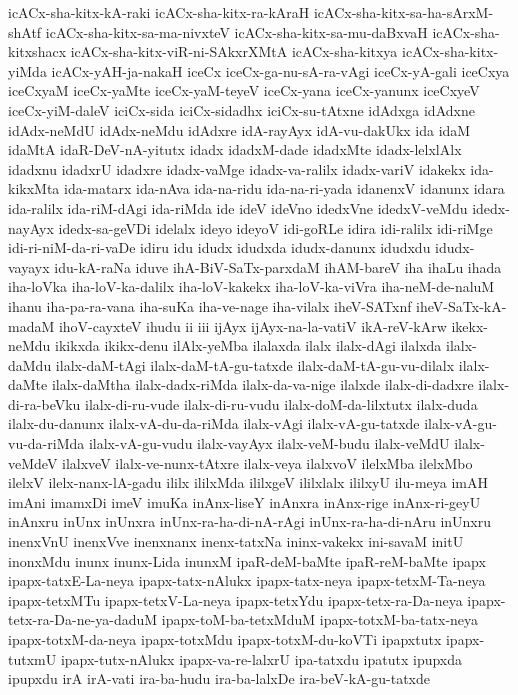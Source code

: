 {icACx-sha-kitx-kA-raki
icACx-sha-kitx-ra-kAraH
icACx-sha-kitx-sa-ha-sArxM-shAtf
icACx-sha-kitx-sa-ma-nivxteV
icACx-sha-kitx-sa-mu-daBxvaH
icACx-sha-kitxshacx
icACx-sha-kitx-viR-ni-SAkxrXMtA
icACx-sha-kitxya
icACx-sha-kitx-yiMda
icACx-yAH-ja-nakaH
iceCx
iceCx-ga-nu-sA-ra-vAgi
iceCx-yA-gali
iceCxya
iceCxyaM
iceCx-yaMte
iceCx-yaM-teyeV
iceCx-yana
iceCx-yanunx
iceCxyeV
iceCx-yiM-daleV
iciCx-sida
iciCx-sidadhx
iciCx-su-tAtxne
idAdxga
idAdxne
idAdx-neMdU
idAdx-neMdu
idAdxre
idA-rayAyx
idA-vu-dakUkx
ida
idaM
idaMtA
idaR-DeV-nA-yitutx
idadx
idadxM-dade
idadxMte
idadx-lelxlAlx
idadxnu
idadxrU
idadxre
idadx-vaMge
idadx-va-ralilx
idadx-variV
idakekx
ida-kikxMta
ida-matarx
ida-nAva
ida-na-ridu
ida-na-ri-yada
idanenxV
idanunx
idara
ida-ralilx
ida-riM-dAgi
ida-riMda
ide
ideV
ideVno
idedxVne
idedxV-veMdu
idedx-nayAyx
idedx-sa-geVDi
idelalx
ideyo
ideyoV
idi-goRLe
idira
idi-ralilx
idi-riMge
idi-ri-niM-da-ri-vaDe
idiru
idu
idudx
idudxda
idudx-danunx
idudxdu
idudx-vayayx
idu-kA-raNa
iduve
ihA-BiV-SaTx-parxdaM
ihAM-bareV
iha
ihaLu
ihada
iha-loVka
iha-loV-ka-dalilx
iha-loV-kakekx
iha-loV-ka-viVra
iha-neM-de-naluM
ihanu
iha-pa-ra-vana
iha-suKa
iha-ve-nage
iha-vilalx
iheV-SATxnf
iheV-SaTx-kA-madaM
ihoV-cayxteV
ihudu
ii
iii
ijAyx
ijAyx-na-la-vatiV
ikA-reV-kArw
ikekx-neMdu
ikikxda
ikikx-denu
ilAlx-yeMba
ilalaxda
ilalx
ilalx-dAgi
ilalxda
ilalx-daMdu
ilalx-daM-tAgi
ilalx-daM-tA-gu-tatxde
ilalx-daM-tA-gu-vu-dilalx
ilalx-daMte
ilalx-daMtha
ilalx-dadx-riMda
ilalx-da-va-nige
ilalxde
ilalx-di-dadxre
ilalx-di-ra-beVku
ilalx-di-ru-vude
ilalx-di-ru-vudu
ilalx-doM-da-lilxtutx
ilalx-duda
ilalx-du-danunx
ilalx-vA-du-da-riMda
ilalx-vAgi
ilalx-vA-gu-tatxde
ilalx-vA-gu-vu-da-riMda
ilalx-vA-gu-vudu
ilalx-vayAyx
ilalx-veM-budu
ilalx-veMdU
ilalx-veMdeV
ilalxveV
ilalx-ve-nunx-tAtxre
ilalx-veya
ilalxvoV
ilelxMba
ilelxMbo
ilelxV
ilelx-nanx-lA-gadu
ililx
ililxMda
ililxgeV
ililxlalx
ililxyU
ilu-meya
imAH
imAni
imamxDi
imeV
imuKa
inAnx-liseY
inAnxra
inAnx-rige
inAnx-ri-geyU
inAnxru
inUnx
inUnxra
inUnx-ra-ha-di-nA-rAgi
inUnx-ra-ha-di-nAru
inUnxru
inenxVnU
inenxVve
inenxnanx
inenx-tatxNa
ininx-vakekx
ini-savaM
initU
inonxMdu
inunx
inunx-Lida
inunxM
ipaR-deM-baMte
ipaR-reM-baMte
ipapx
ipapx-tatxE-La-neya
ipapx-tatx-nAlukx
ipapx-tatx-neya
ipapx-tetxM-Ta-neya
ipapx-tetxMTu
ipapx-tetxV-La-neya
ipapx-tetxYdu
ipapx-tetx-ra-Da-neya
ipapx-tetx-ra-Da-ne-ya-daduM
ipapx-toM-ba-tetxMduM
ipapx-totxM-ba-tatx-neya
ipapx-totxM-da-neya
ipapx-totxMdu
ipapx-totxM-du-koVTi
ipapxtutx
ipapx-tutxmU
ipapx-tutx-nAlukx
ipapx-va-re-lalxrU
ipa-tatxdu
ipatutx
ipupxda
ipupxdu
irA
irA-vati
ira-ba-hudu
ira-ba-lalxDe
ira-beV-kA-gu-tatxde
}
